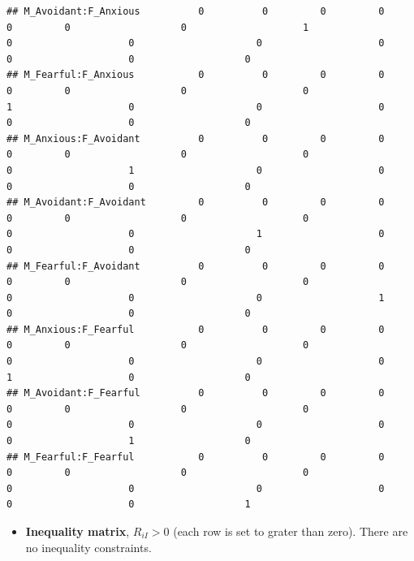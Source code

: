 \documentclass[
]{book}
\providecommand{\tightlist}{%
  \setlength{\itemsep}{0pt}\setlength{\parskip}{0pt}}
\begin{document}
\begin{verbatim}
## M_Avoidant:F_Anxious          0          0         0         0          0         0                   0                    1                   0                    0                     0                    0                   0                    0                   0
## M_Fearful:F_Anxious           0          0         0         0          0         0                   0                    0                   1                    0                     0                    0                   0                    0                   0
## M_Anxious:F_Avoidant          0          0         0         0          0         0                   0                    0                   0                    1                     0                    0                   0                    0                   0
## M_Avoidant:F_Avoidant         0          0         0         0          0         0                   0                    0                   0                    0                     1                    0                   0                    0                   0
## M_Fearful:F_Avoidant          0          0         0         0          0         0                   0                    0                   0                    0                     0                    1                   0                    0                   0
## M_Anxious:F_Fearful           0          0         0         0          0         0                   0                    0                   0                    0                     0                    0                   1                    0                   0
## M_Avoidant:F_Fearful          0          0         0         0          0         0                   0                    0                   0                    0                     0                    0                   0                    1                   0
## M_Fearful:F_Fearful           0          0         0         0          0         0                   0                    0                   0                    0                     0                    0                   0                    0                   1
\end{verbatim}

\begin{itemize}
\tightlist
\item
  \textbf{Inequality matrix}, \(R_{iI} > 0\) (each row is set to grater than zero). There are no inequality constraints.
\end{itemize}
\end{document}
